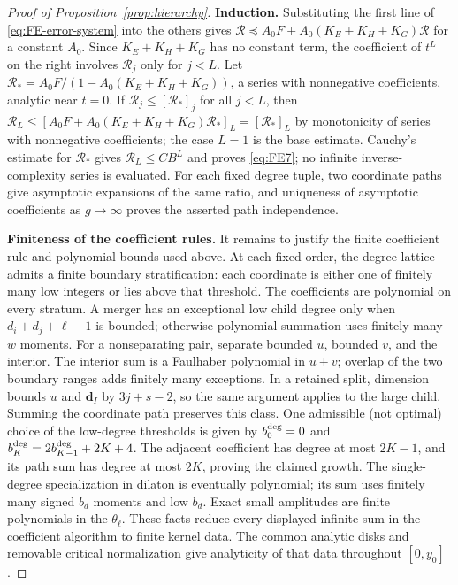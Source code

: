 \begin{proof}[Proof of Proposition~\ref{prop:hierarchy}]
\textbf{Induction.} Substituting the first line of
\eqref{eq:FE-error-system} into the others gives
$\mathscr R\preceq A_0F+A_0(K_E+K_H+K_G)\mathscr R$ for a constant
$A_0$. Since $K_E+K_H+K_G$ has no constant term, the coefficient of
$t^L$ on the right involves $\mathscr R_j$ only for $j<L$. Let
$\mathscr R_*=A_0F/(1-A_0(K_E+K_H+K_G))$, a series with nonnegative
coefficients, analytic near $t=0$. If $\mathscr R_j\le[\mathscr R_*]_j$
for all $j<L$, then
$\mathscr R_L\le[A_0F+A_0(K_E+K_H+K_G)\mathscr R_*]_L=[\mathscr R_*]_L$
by monotonicity of series with nonnegative coefficients; the case $L=1$
is the base estimate. Cauchy's estimate for $\mathscr R_*$ gives
$\mathscr R_L\le CB^L$ and proves \eqref{eq:FE7}; no infinite
inverse-complexity series is evaluated. For each fixed degree tuple, two
coordinate paths give asymptotic expansions of the same ratio, and
uniqueness of asymptotic coefficients as $g\to\infty$ proves the asserted
path independence.

\textbf{Finiteness of the coefficient rules.} It remains to justify the finite coefficient rule and polynomial
bounds used above. At each fixed order, the degree lattice admits a
finite boundary stratification: each coordinate is either one of
finitely many low integers or lies above that threshold. The
coefficients are polynomial on every stratum. A merger has an
exceptional low child degree only when $d_i+d_j+\ell-1$ is bounded;
otherwise polynomial summation uses finitely many $w$ moments.
For a nonseparating pair, separate bounded $u$, bounded $v$, and the
interior. The interior sum is a Faulhaber polynomial in $u+v$;
overlap of the two boundary ranges adds finitely many exceptions.
In a retained split, dimension bounds $u$ and $\mathbf d_I$ by
$3j+s-2$, so the same argument applies to the large child.
Summing the coordinate path preserves this class. One admissible (not
optimal) choice of the low-degree thresholds is given by $b_0^{\rm deg}=0$ and
$b_K^{\rm deg}=2b_{K-1}^{\rm deg}+2K+4$.
The adjacent coefficient has degree at most $2K-1$, and its path sum
has degree at most $2K$, proving the claimed growth.
The single-degree specialization in dilaton is eventually polynomial;
its sum uses finitely many signed $b_d$ moments and low $b_d$.
Exact small amplitudes are finite polynomials in the $\theta_\ell$. These facts
reduce every displayed infinite sum in the coefficient algorithm to
finite kernel data. The common analytic disks and removable critical
normalization give analyticity of that data throughout $[0,y_0]$.
\end{proof}

